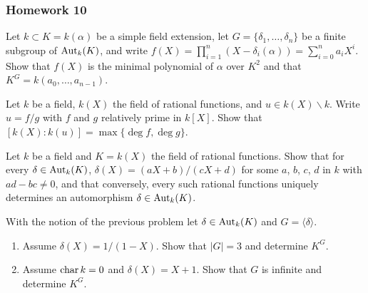 \subsubsection{Homework 10}
\begin{problem}
  Let $k\subset K=k(\alpha)$ be a simple field extension, let
  $G=\{\delta_1,\dotsc,\delta_n\}$ be a finite subgroup of
  $\operatorname{Aut}_k(K)$, and write
  $f(X)=\prod_{i=1}^n(X-\delta_i(\alpha))=\sum_{i=0}^na_iX^i$. Show
  that $f(X)$ is the minimal polynomial of $\alpha$ over $K^2$ and that
  $K^G=k(a_0,\dotsc,a_{n-1})$.
\end{problem}
\begin{solution}
\end{solution}

\begin{problem}
  Let $k$ be a field, $k(X)$ the field of rational functions, and
  $u\in k(X)\smallsetminus k$. Write $u= f/g$ with $f$ and $g$
  relatively prime in $k[X]$. Show that
  $[k(X):k(u)]=\max\{\deg f,\deg g\}$.
\end{problem}
\begin{solution}
\end{solution}

\begin{problem}
  Let $k$ be a field and $K= k(X)$ the field of rational
  functions. Show that for every $\delta\in\operatorname{Aut}_k(K)$,
  $\delta(X)= (aX+b)/(cX+d)$ for some $a$, $b$, $c$, $d$ in $k$ with
  $ad-bc\neq 0$, and that conversely, every such rational functions
  uniquely determines an automorphism $\delta\in\operatorname{Aut}_k(K)$.
\end{problem}
\begin{solution}
\end{solution}

\begin{problem}
With the notion of the previous problem let $\delta\in\operatorname{Aut}_k(K)$ and
$G=\langle \delta \rangle$.
\begin{enumerate}[label=(\alph*),noitemsep]
\item Assume $\delta(X)=1/(1-X)$. Show that $|G|=3$ and determine $K^G$.
\item Assume $\operatorname{char} k=0$ and $\delta(X)=X+1$. Show that $G$ is infinite and
  determine $K^G$.
\end{enumerate}
\end{problem}
\begin{solution}
\end{solution}

